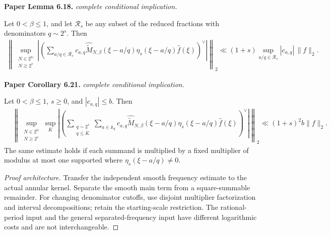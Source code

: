 \begin{lemma}
\label{annular_multifrequency}
\leanok
\par\medskip\noindent\textbf{Paper Lemma 6.18.} \textit{complete conditional implication.}\par
Let \(0<\beta\leq1\), and let \(\mathcal R_s\) be any subset of the
reduced fractions with denominators \(q\sim2^s\).  Then
\begin{align}
\left\|
 \sup_{\substack{N\in2^{\mathbb N}\\N\gtrsim2^s}}
 \left|
 \left(
 \sum_{a/q\in\mathcal R_s}
 c_{a,q}\widehat{\widetilde M}_{N,\beta}(\xi-a/q)
 \eta_s(\xi-a/q)\widehat f(\xi)
 \right)^\vee
 \right|
 \right\|_2
 \ll
 (1+s)\sup_{a/q\in\mathcal R_s}|c_{a,q}|\,\|f\|_2.
\end{align}
\par\medskip\noindent\textbf{Paper Corollary 6.21.} \textit{complete conditional implication.}\par
Let \(0<\beta\leq1\), \(s\geq0\), and
\(|c_{a,q}|\leq b\).  Then
\begin{align}
 &\left\|
 \sup_{\substack{N\in2^{\mathbb N}\\N\geq2^s}}
 \sup_K
 \left|
 \left(
 \sum_{\substack{q\sim2^s\\q\leq K}}
 \sum_{a\in\mathbb A_q}
 c_{a,q}
 \widehat{\widetilde M}_{N,\beta}(\xi-a/q)
 \eta_s(\xi-a/q)\widehat f(\xi)
 \right)^\vee
 \right|
 \right\|_2
 \ll (1+s)^2b\|f\|_2.
\end{align}
The same estimate holds if each summand is multiplied by a fixed
multiplier of modulus at most one supported where
\(\eta_s(\xi-a/q)\neq0\).
\end{lemma}
\begin{proof}[Proof architecture]
\leanok
Transfer the independent smooth frequency estimate to the actual annular kernel. Separate the smooth main term from a square-summable remainder. For changing denominator cutoffs, use disjoint multiplier factorization and interval decompositions; retain the starting-scale restriction. The rational-period input and the general separated-frequency input have different logarithmic costs and are not interchangeable.
\end{proof}

